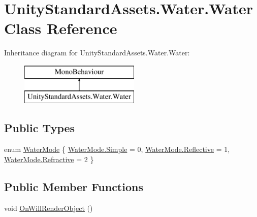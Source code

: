 \hypertarget{class_unity_standard_assets_1_1_water_1_1_water}{}\section{Unity\+Standard\+Assets.\+Water.\+Water Class Reference}
\label{class_unity_standard_assets_1_1_water_1_1_water}
Inheritance diagram for Unity\+Standard\+Assets.\+Water.\+Water\+:\begin{figure}[H]
\begin{center}
\leavevmode
\includegraphics[height=2.000000cm]{class_unity_standard_assets_1_1_water_1_1_water}
\end{center}
\end{figure}
\subsection*{Public Types}
\begin{DoxyCompactItemize}
\item 
enum \mbox{\hyperlink{class_unity_standard_assets_1_1_water_1_1_water_a9e5d3bf13fa82b48b85d9f90f707379e}{Water\+Mode}} \{ \mbox{\hyperlink{class_unity_standard_assets_1_1_water_1_1_water_a9e5d3bf13fa82b48b85d9f90f707379ea1fbb1e3943c2c6c560247ac8f9289780}{Water\+Mode.\+Simple}} = 0, 
\mbox{\hyperlink{class_unity_standard_assets_1_1_water_1_1_water_a9e5d3bf13fa82b48b85d9f90f707379ea3889e081f93c67991c06d95705cee7e6}{Water\+Mode.\+Reflective}} = 1, 
\mbox{\hyperlink{class_unity_standard_assets_1_1_water_1_1_water_a9e5d3bf13fa82b48b85d9f90f707379eadced932db1d01033f77c380f76362e2f}{Water\+Mode.\+Refractive}} = 2
 \}
\end{DoxyCompactItemize}
\subsection*{Public Member Functions}
\begin{DoxyCompactItemize}
\item 
void \mbox{\hyperlink{class_unity_standard_assets_1_1_water_1_1_water_acb0ccefbe5352b8cee30e3f5412a0984}{On\+Will\+Render\+Object}} ()
\end{DoxyCompactItemize}
